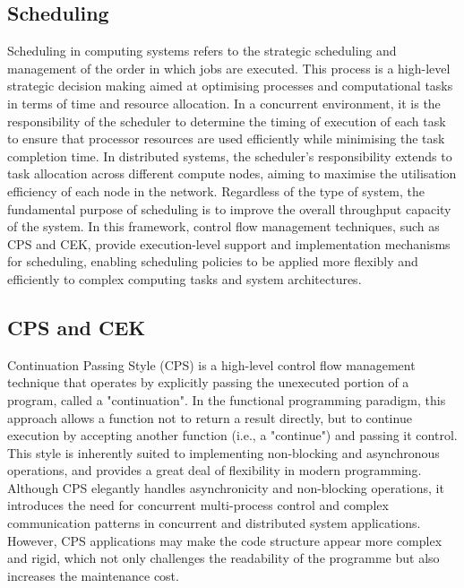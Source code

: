 \documentclass{l4proj}
\begin{document}
\subsection{Scheduling}
Scheduling in computing systems refers to the strategic scheduling and management of the order in which jobs are executed. This process is a high-level strategic decision making aimed at optimising processes and computational tasks in terms of time and resource allocation. In a concurrent environment, it is the responsibility of the scheduler to determine the timing of execution of each task to ensure that processor resources are used efficiently while minimising the task completion time. In distributed systems, the scheduler's responsibility extends to task allocation across different compute nodes, aiming to maximise the utilisation efficiency of each node in the network. Regardless of the type of system, the fundamental purpose of scheduling is to improve the overall throughput capacity of the system. In this framework, control flow management techniques, such as CPS and CEK, provide execution-level support and implementation mechanisms for scheduling, enabling scheduling policies to be applied more flexibly and efficiently to complex computing tasks and system architectures.

\subsection{CPS and CEK}
Continuation Passing Style (CPS) is a high-level control flow management technique that operates by explicitly passing the unexecuted portion of a program, called a "continuation". In the functional programming paradigm, this approach allows a function not to return a result directly, but to continue execution by accepting another function (i.e., a "continue") and passing it control. This style is inherently suited to implementing non-blocking and asynchronous operations, and provides a great deal of flexibility in modern programming. Although CPS elegantly handles asynchronicity and non-blocking operations, it introduces the need for concurrent multi-process control and complex communication patterns in concurrent and distributed system applications. However, CPS applications may make the code structure appear more complex and rigid, which not only challenges the readability of the programme but also increases the maintenance cost.
\end{document}
